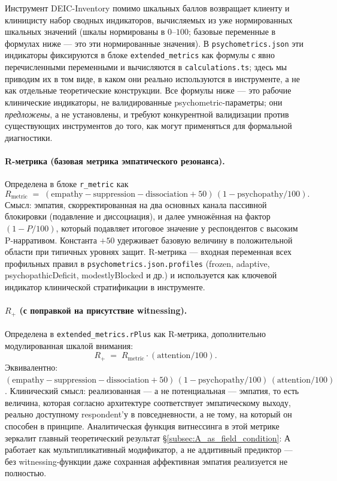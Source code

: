 Инструмент DEIC-Inventory помимо шкальных баллов возвращает клиенту и клиницисту набор сводных индикаторов, вычисляемых из уже нормированных шкальных значений (шкалы нормированы в $0$--$100$; базовые переменные в формулах ниже --- это эти нормированные значения). В \texttt{psychometrics.json} эти индикаторы фиксируются в блоке \texttt{extended\_metrics} как формулы с явно перечисленными переменными и вычисляются в \texttt{calculations.ts}; здесь мы приводим их в том виде, в каком они реально используются в инструменте, а не как отдельные теоретические конструкции. Все формулы ниже --- это рабочие клинические индикаторы, не валидированные psychometric-параметры; они \emph{предложены}, а не установлены, и требуют конкурентной валидизации против существующих инструментов до того, как могут применяться для формальной диагностики.

\paragraph{R-метрика (базовая метрика эмпатического резонанса).} Определена в блоке \texttt{r\_metric} как
\[
R_{\text{metric}} \;=\; (\text{empathy} - \text{suppression} - \text{dissociation} + 50)\,(1 - \text{psychopathy}/100).
\]
Смысл: эмпатия, скорректированная на два основных канала пассивной блокировки (подавление и диссоциация), и далее умножённая на фактор $(1 - P/100)$, который подавляет итоговое значение у респондентов с высоким P-нарративом. Константа $+50$ удерживает базовую величину в положительной области при типичных уровнях защит. R-метрика --- входная переменная всех профильных правил в \texttt{psychometrics.json.profiles} (frozen, adaptive, psychopathicDeficit, modestlyBlocked и др.) и используется как ключевой индикатор клинической стратификации в инструменте.

\paragraph{$R_{+}$ (с поправкой на присутствие witnessing).} Определена в \texttt{extended\_metrics.rPlus} как R-метрика, дополнительно модулированная шкалой внимания:
\[
R_{+} \;=\; R_{\text{metric}} \cdot (\text{attention}/100).
\]
Эквивалентно: $(\text{empathy} - \text{suppression} - \text{dissociation} + 50)\,(1 - \text{psychopathy}/100)\,(\text{attention}/100)$. Клинический смысл: реализованная --- а не потенциальная --- эмпатия, то есть величина, которая согласно архитектуре \DEIC{} соответствует эмпатическому выходу, реально доступному respondent'у в повседневности, а не тому, на который он способен в принципе. Аналитическая функция витнессинга в этой метрике зеркалит главный теоретический результат §\ref{subsec:A_as_field_condition}: А работает как мультипликативный модификатор, а не аддитивный предиктор --- без witnessing-функции даже сохранная аффективная эмпатия реализуется не полностью.

